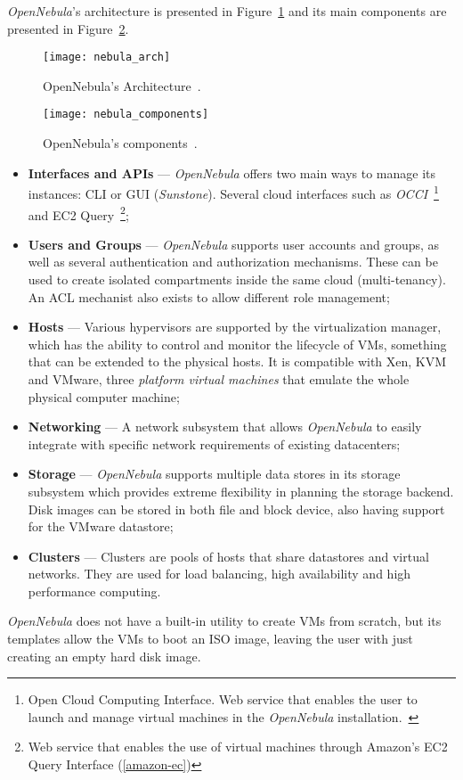 \textit{OpenNebula}'s architecture is presented in Figure~\ref{fig:nebula_arch} and its main components are presented in Figure~\ref{fig:nebula_components}.

\begin{figure}[h!]
  \begin{center}
    \leavevmode
    \texttt{[image: nebula\_arch]}
    \caption{OpenNebula's Architecture~\cite{nebulatech}.}
    \label{fig:nebula_arch}
  \end{center}
\end{figure}

\begin{figure}[h!]
  \begin{center}
    \leavevmode
    \texttt{[image: nebula\_components]}
    \caption{OpenNebula's components~\cite{nebulacomponents}.}
    \label{fig:nebula_components}
  \end{center} 
\end{figure}


\begin{itemize}
\item \textbf{Interfaces and APIs} --- \textit{OpenNebula} offers two main ways to manage its instances: CLI or GUI (\textit{Sunstone}). Several cloud interfaces such as \textit{OCCI}~\footnote{Open Cloud Computing Interface. Web service that enables the user to launch and manage virtual machines in the \textit{OpenNebula} installation.~\cite{occi}} and EC2 Query~\footnote{Web service that enables the use of virtual machines through Amazon's EC2 Query Interface (\ref{amazon-ec})};
\item \textbf{Users and Groups} --- \textit{OpenNebula} supports user accounts and groups, as well as several authentication and authorization mechanisms. These can be used to create isolated compartments inside the same cloud (multi-tenancy). An ACL mechanist also exists to allow different role management;
\item \textbf{Hosts} --- Various hypervisors are supported by the virtualization manager, which has the ability to control and monitor the lifecycle of VMs, something that can be extended to the physical hosts. It is compatible with Xen, KVM and VMware, three \textit{platform virtual machines} that emulate the whole physical computer machine;
\item \textbf{Networking} --- A network subsystem that allows \textit{OpenNebula} to easily integrate with specific network requirements of existing datacenters;
\item \textbf{Storage} --- \textit{OpenNebula} supports multiple data stores in its storage subsystem which provides extreme flexibility in planning the storage backend. Disk images can be stored in both file and block device, also having support for the VMware datastore;
\item \textbf{Clusters} --- Clusters are pools of hosts that share datastores and virtual networks. They are used for load balancing, high availability and high performance computing.
\end{itemize}
\textit{OpenNebula} does not have a built-in utility to create VMs from scratch, but its templates allow the VMs to boot an ISO image, leaving the user with just creating an empty hard disk image.

